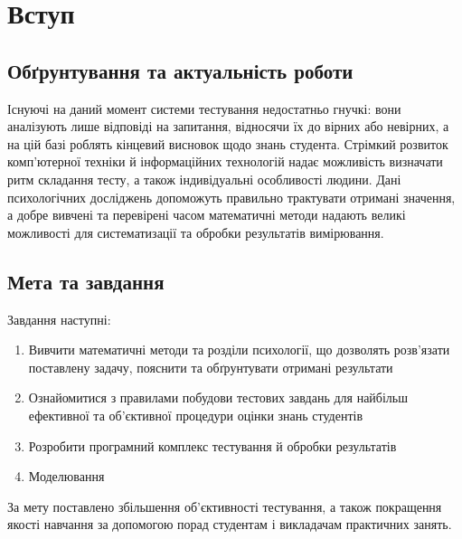 \chapter{Вступ}
\section{Обґрунтування та актуальність роботи}
Існуючі на даний момент системи тестування недостатньо гнучкі: вони
аналізують лише відповіді на запитання, відносячи їх до вірних або невірних,
а на цій базі роблять кінцевий висновок щодо знань студента.
Стрімкий розвиток комп’ютерної техніки й інформаційних технологій надає
можливість визначати ритм складання тесту, а також індивідуальні особливості
людини.
Дані психологічних досліджень допоможуть правильно трактувати отримані
значення, а добре вивчені та перевірені часом математичні методи надають
великі можливості для систематизації та обробки результатів вимірювання.

\section{Мета та завдання}
Завдання наступні:
\begin{enumerate}
  \item
    Вивчити математичні методи та розділи психології, що дозволять розв’язати
    поставлену задачу, пояснити та обґрунтувати отримані результати
  \item
    Ознайомитися з правилами побудови тестових завдань для найбільш
    ефективної та об’єктивної процедури оцінки знань студентів
  \item
    Розробити програмний комплекс тестування й обробки результатів
  \item
    Моделювання
\end{enumerate}

За мету поставлено збільшення об’єктивності тестування, а також покращення
якості навчання за допомогою порад студентам і викладачам практичних занять.
